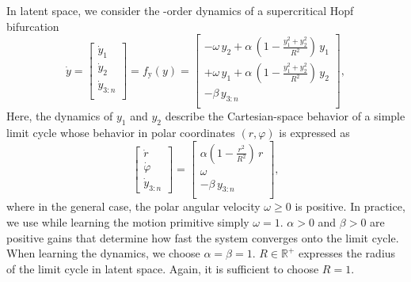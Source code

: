 In latent space, we consider the -order dynamics of a supercritical Hopf bifurcation~\citep{strogatz2018nonlinear}
\begin{equation}
    \dot{y} = \begin{bmatrix}
        \dot{y}_1\\
        \dot{y}_2\\
        \dot{y}_{3:n}\\
    \end{bmatrix} = f_\mathrm{y}(y) = \begin{bmatrix}
        -\omega \, y_2 + \alpha \, \left ( 1 - \frac{y_1^2 + y_2^2}{R^2} \right ) \, y_1\\
        + \omega \, y_1 + \alpha \, \left ( 1 - \frac{y_1^2 + y_2^2}{R^2} \right ) \, y_2\\
        -\beta \, y_{3:n}\\
    \end{bmatrix},
\end{equation}
Here, the dynamics of $y_1$ and $y_2$ describe the Cartesian-space behavior of a simple limit cycle whose behavior in polar coordinates $(r, \varphi)$ is expressed as
\begin{equation}
    \begin{bmatrix}
        \dot{r}\\ \dot{\varphi}\\ \dot{y}_{3:n}
    \end{bmatrix} = \begin{bmatrix}
        \alpha \left ( 1 - \frac{r^2}{R^2} \right ) \, r\\ \omega\\ -\beta \, y_{3:n}\\
    \end{bmatrix},
\end{equation}
where in the general case, the polar angular velocity $\omega \geq 0$ is positive. In practice, we use while learning the motion primitive simply $\omega = 1$. $\alpha > 0$ and $\beta > 0$ are positive gains that determine how fast the system converges onto the limit cycle. When learning the dynamics, we choose $\alpha = \beta = 1$. $R \in \mathbb{R}^+$ expresses the radius of the limit cycle in latent space. Again, it is sufficient to choose $R =1$.

